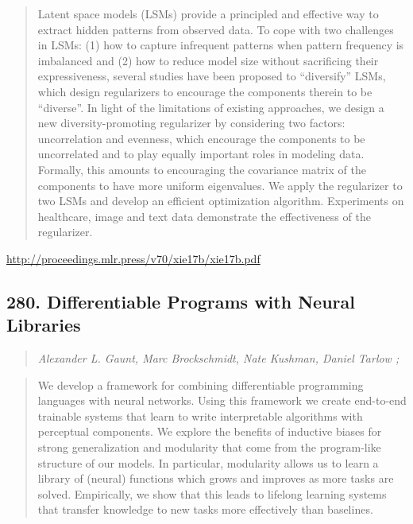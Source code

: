 \documentclass{article}
\begin{document}
\begin{quote}
    Latent space models (LSMs) provide a principled and effective way to extract hidden patterns from observed data. To cope with two challenges in LSMs: (1) how to capture infrequent patterns when pattern frequency is imbalanced and (2) how to reduce model size without sacrificing their expressiveness, several studies have been proposed to “diversify” LSMs, which design regularizers to encourage the components therein to be “diverse”. In light of the limitations of existing approaches, we design a new diversity-promoting regularizer by considering two factors: uncorrelation and evenness, which encourage the components to be uncorrelated and to play equally important roles in modeling data. Formally, this amounts to encouraging the covariance matrix of the components to have more uniform eigenvalues. We apply the regularizer to two LSMs and develop an efficient optimization algorithm. Experiments on healthcare, image and text data demonstrate the effectiveness of the regularizer.  
\end{quote}

\href{http://proceedings.mlr.press/v70/xie17b/xie17b.pdf}{http://proceedings.mlr.press/v70/xie17b/xie17b.pdf}

\subsection{280. Differentiable Programs with Neural Libraries}

\begin{quote}
\footnotesize{\textit{Alexander L. Gaunt, Marc Brockschmidt, Nate Kushman, Daniel Tarlow ;}}

\end{quote}

\begin{quote}
    We develop a framework for combining differentiable programming languages with neural networks. Using this framework we create end-to-end trainable systems that learn to write interpretable algorithms with perceptual components. We explore the benefits of inductive biases for strong generalization and modularity that come from the program-like structure of our models. In particular, modularity allows us to learn a library of (neural) functions which grows and improves as more tasks are solved. Empirically, we show that this leads to lifelong learning systems that transfer knowledge to new tasks more effectively than baselines.  
\end{quote}
\end{document}
